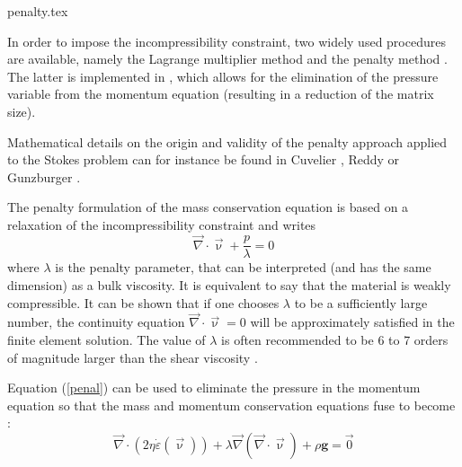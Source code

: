 \begin{flushright} {\tiny {\color{gray} penalty.tex}} \end{flushright}

\label{sec_penalty}


In order to impose the incompressibility constraint, two widely used procedures are available, namely the 
Lagrange multiplier method and the penalty method \cite{bathe82,hugh}. The latter is implemented 
in \elefant, which allows for the elimination of the pressure variable from the momentum equation 
(resulting in a reduction of the matrix size).%

Mathematical details on the origin and validity of the penalty approach applied to the Stokes problem 
can for instance be found in  Cuvelier \etal \cite{cuss86}, Reddy \cite{redd82} or Gunzburger \cite{gunz89}.

The penalty formulation of the mass conservation equation is based on a relaxation of 
the incompressibility constraint and writes 
\begin{equation}
{\vec \nabla}\cdot {\vec \upnu} + \frac{p}{\lambda} = 0 \label{penal}
\end{equation}
where $\lambda$ is the penalty parameter, that can be interpreted (and has the same dimension) 
as a bulk viscosity. It is 
equivalent to say that the material is weakly compressible. It can be shown 
that if one chooses $\lambda$ to be a 
sufficiently large number, the continuity equation $ {\vec \nabla}\cdot {\vec \upnu} = 0$ will 
be approximately satisfied in the finite element solution. The value of $\lambda$ is often recommended 
to be 6 to 7 orders of magnitude larger than the shear viscosity \cite{dohu03,hulb79}.


Equation (\ref{penal}) can be used to eliminate the pressure in the momentum equation 
so that the mass and momentum conservation equations fuse to become :
\begin{equation}
{\vec \nabla}\cdot ( 2 \eta \dot\varepsilon({\vec \upnu})) 
+ \lambda {\vec \nabla} ({\vec \nabla }\cdot {\vec \upnu}) + \rho {\bm g} = \vec{0} \label{peneq}
\end{equation}


